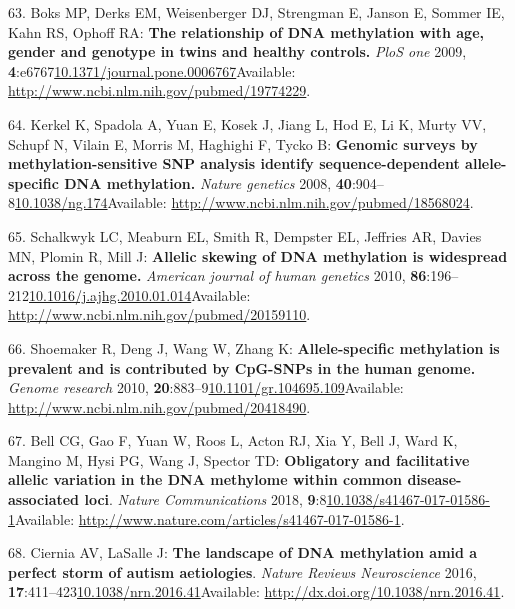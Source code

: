 \documentclass[
]{book}
\begin{document}
\leavevmode\hypertarget{ref-Boks2009}{}%
63. Boks MP, Derks EM, Weisenberger DJ, Strengman E, Janson E, Sommer IE, Kahn RS, Ophoff RA: \textbf{The relationship of DNA methylation with age, gender and genotype in twins and healthy controls.} \emph{PloS one} 2009, \textbf{4}:e6767\href{https://doi.org/10.1371/journal.pone.0006767}{10.1371/journal.pone.0006767}Available: \url{http://www.ncbi.nlm.nih.gov/pubmed/19774229}.

\leavevmode\hypertarget{ref-Kerkel2008}{}%
64. Kerkel K, Spadola A, Yuan E, Kosek J, Jiang L, Hod E, Li K, Murty VV, Schupf N, Vilain E, Morris M, Haghighi F, Tycko B: \textbf{Genomic surveys by methylation-sensitive SNP analysis identify sequence-dependent allele-specific DNA methylation.} \emph{Nature genetics} 2008, \textbf{40}:904--8\href{https://doi.org/10.1038/ng.174}{10.1038/ng.174}Available: \url{http://www.ncbi.nlm.nih.gov/pubmed/18568024}.

\leavevmode\hypertarget{ref-Schalkwyk2010}{}%
65. Schalkwyk LC, Meaburn EL, Smith R, Dempster EL, Jeffries AR, Davies MN, Plomin R, Mill J: \textbf{Allelic skewing of DNA methylation is widespread across the genome.} \emph{American journal of human genetics} 2010, \textbf{86}:196--212\href{https://doi.org/10.1016/j.ajhg.2010.01.014}{10.1016/j.ajhg.2010.01.014}Available: \url{http://www.ncbi.nlm.nih.gov/pubmed/20159110}.

\leavevmode\hypertarget{ref-Shoemaker2010}{}%
66. Shoemaker R, Deng J, Wang W, Zhang K: \textbf{Allele-specific methylation is prevalent and is contributed by CpG-SNPs in the human genome.} \emph{Genome research} 2010, \textbf{20}:883--9\href{https://doi.org/10.1101/gr.104695.109}{10.1101/gr.104695.109}Available: \url{http://www.ncbi.nlm.nih.gov/pubmed/20418490}.

\leavevmode\hypertarget{ref-Bell2017a}{}%
67. Bell CG, Gao F, Yuan W, Roos L, Acton RJ, Xia Y, Bell J, Ward K, Mangino M, Hysi PG, Wang J, Spector TD: \textbf{Obligatory and facilitative allelic variation in the DNA methylome within common disease-associated loci}. \emph{Nature Communications} 2018, \textbf{9}:8\href{https://doi.org/10.1038/s41467-017-01586-1}{10.1038/s41467-017-01586-1}Available: \url{http://www.nature.com/articles/s41467-017-01586-1}.

\leavevmode\hypertarget{ref-Ciernia2016}{}%
68. Ciernia AV, LaSalle J: \textbf{The landscape of DNA methylation amid a perfect storm of autism aetiologies}. \emph{Nature Reviews Neuroscience} 2016, \textbf{17}:411--423\href{https://doi.org/10.1038/nrn.2016.41}{10.1038/nrn.2016.41}Available: \url{http://dx.doi.org/10.1038/nrn.2016.41}.
\end{document}

